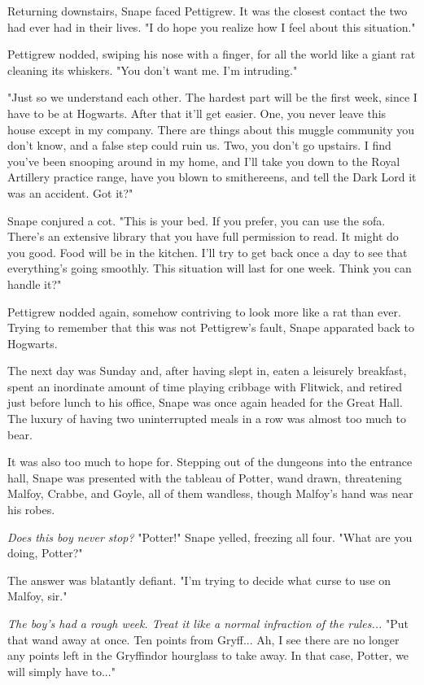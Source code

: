 \documentclass[a4paper,11pt]{article}
\begin{document}
Returning downstairs, Snape faced Pettigrew. It was the closest contact the two had ever had in their lives. "I do hope you realize how I feel about this situation."

Pettigrew nodded, swiping his nose with a finger, for all the world like a giant rat cleaning its whiskers. "You don't want me. I'm intruding."

"Just so we understand each other. The hardest part will be the first week, since I have to be at Hogwarts. After that it'll get easier. One, you never leave this house except in my company. There are things about this muggle community you don't know, and a false step could ruin us. Two, you don't go upstairs. I find you've been snooping around in my home, and I'll take you down to the Royal Artillery practice range, have you blown to smithereens, and tell the Dark Lord it was an accident. Got it?"

Snape conjured a cot. "This is your bed. If you prefer, you can use the sofa. There's an extensive library that you have full permission to read. It might do you good. Food will be in the kitchen. I'll try to get back once a day to see that everything's going smoothly. This situation will last for one week. Think you can handle it?"

Pettigrew nodded again, somehow contriving to look more like a rat than ever. Trying to remember that this was not Pettigrew's fault, Snape apparated back to Hogwarts.

The next day was Sunday and, after having slept in, eaten a leisurely breakfast, spent an inordinate amount of time playing cribbage with Flitwick, and retired just before lunch to his office, Snape was once again headed for the Great Hall. The luxury of having two uninterrupted meals in a row was almost too much to bear.

It was also too much to hope for. Stepping out of the dungeons into the entrance hall, Snape was presented with the tableau of Potter, wand drawn, threatening Malfoy, Crabbe, and Goyle, all of them wandless, though Malfoy's hand was near his robes.

\emph{Does this boy never stop?} "Potter!" Snape yelled, freezing all four. "What are you doing, Potter?"

The answer was blatantly defiant. "I'm trying to decide what curse to use on Malfoy, sir."

\emph{The boy's had a rough week. Treat it like a normal infraction of the rules...} "Put that wand away at once. Ten points from Gryff... Ah, I see there are no longer any points left in the Gryffindor hourglass to take away. In that case, Potter, we will simply have to..."
\end{document}
